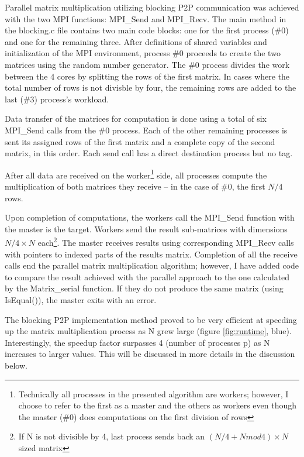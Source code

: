 \documentclass[12pt]{report}
\begin{document}
Parallel matrix multiplication utilizing blocking P2P communication was achieved with the two MPI functions: MPI\_Send and MPI\_Recv. The main method in the blocking.c file contains two main code blocks: one for the first process (\#0) and one for the remaining three. After definitions of shared variables and initialization of the MPI environment, process \#0 proceeds to create the two matrices using the random number generator. The \#0 process divides the work between the 4 cores by splitting the rows of the first matrix. In cases where the total number of rows is not divisble by four, the remaining rows are added to the last (\#3) process's workload.

Data transfer of the matrices for computation is done using a total of six MPI\_Send calls from the \#0 process. Each of the other remaining processes is sent its assigned rows of the first matrix and a complete copy of the second matrix, in this order. Each send call has a direct destination process but no tag. 

After all data are received on the worker\footnote{\label{^2}Technically all processes in the presented algorithm are workers; however, I choose to refer to the first as a master and the others as workers even though the master (\#0) does computations on the first division of rows} side, all processes compute the multiplication of both matrices they receive -- in the case of \#0, the first $N/4$ rows.

Upon completion of computations, the workers call the MPI\_Send function with the master is the target. Workers send the result sub-matrices with dimensions $N/4 \times N$ each\footnote{\label{^3}If N is not divisible by 4, last process sends back an $(N/4 + N mod 4) \times N$ sized matrix}. The master receives results using corresponding MPI\_Recv calls with pointers to indexed parts of the results matrix. Completion of all the receive calls end the parallel matrix multiplication algorithm; however, I have added code to compare the result achieved with the parallel approach to the one calculated by the Matrix\_serial function. If they do not produce the same matrix (using IsEqual()), the master exits with an error.

The blocking P2P implementation method proved to be very efficient at speeding up the matrix multiplication process as N grew large (figure \ref{fig:runtime}, blue). Interestingly, the speedup factor surpasses 4 (number of processes p) as N increases to larger values. This will be discussed in more details in the discussion below.
\end{document}
